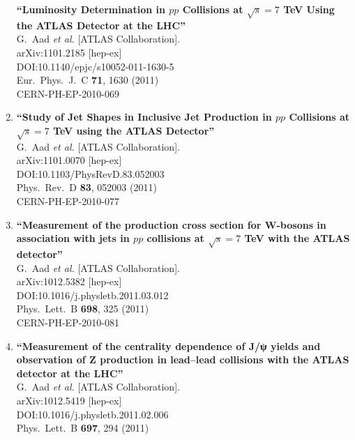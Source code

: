 \documentclass{article}
\begin{document}
\begin{enumerate}
{\bf ``Luminosity Determination in $pp$ Collisions at $\sqrt{s}=7$ TeV Using the ATLAS Detector at the LHC''}
  \\{}G.~Aad {\it et al.} [ATLAS Collaboration].
  \\{}arXiv:1101.2185 [hep-ex]
  \\{}DOI:10.1140/epjc/s10052-011-1630-5
  \\{}Eur.\ Phys.\ J.\ C {\bf 71}, 1630 (2011)
  \\{}CERN-PH-EP-2010-069
\item%
{\bf ``Study of Jet Shapes in Inclusive Jet Production in $pp$ Collisions at $\sqrt{s}=7$ TeV using the ATLAS Detector''}
  \\{}G.~Aad {\it et al.} [ATLAS Collaboration].
  \\{}arXiv:1101.0070 [hep-ex]
  \\{}DOI:10.1103/PhysRevD.83.052003
  \\{}Phys.\ Rev.\ D {\bf 83}, 052003 (2011)
  \\{}CERN-PH-EP-2010-077
\item%
{\bf ``Measurement of the production cross section for W-bosons in association with jets in $pp$ collisions at $\sqrt{s}=7$ TeV with the ATLAS detector''}
  \\{}G.~Aad {\it et al.} [ATLAS Collaboration].
  \\{}arXiv:1012.5382 [hep-ex]
  \\{}DOI:10.1016/j.physletb.2011.03.012
  \\{}Phys.\ Lett.\ B {\bf 698}, 325 (2011)
  \\{}CERN-PH-EP-2010-081
\item%
{\bf ``Measurement of the centrality dependence of J/ψ yields and observation of Z production in lead–lead collisions with the ATLAS detector at the LHC''}
  \\{}G.~Aad {\it et al.} [ATLAS Collaboration].
  \\{}arXiv:1012.5419 [hep-ex]
  \\{}DOI:10.1016/j.physletb.2011.02.006
  \\{}Phys.\ Lett.\ B {\bf 697}, 294 (2011)

\end{enumerate}
\end{document}
